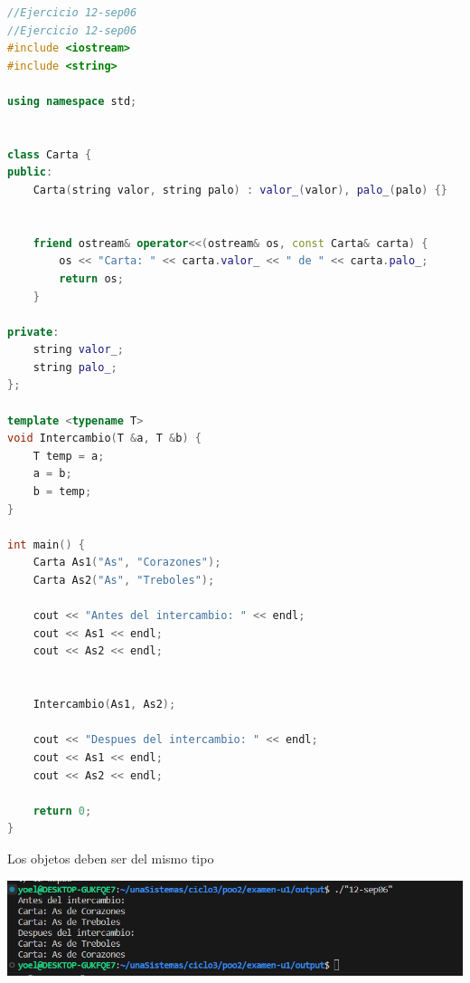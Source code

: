\documentclass[11pt,a4paper]{article}
\begin{document}
\begin{lstlisting}[language=C++, style=mystyle, caption={12 SEPT06}]
//Ejercicio 12-sep06
//Ejercicio 12-sep06
#include <iostream>
#include <string>

using namespace std;


class Carta {
public:
    Carta(string valor, string palo) : valor_(valor), palo_(palo) {}

 
    friend ostream& operator<<(ostream& os, const Carta& carta) {
        os << "Carta: " << carta.valor_ << " de " << carta.palo_;
        return os;
    }

private:
    string valor_;
    string palo_;
};

template <typename T>
void Intercambio(T &a, T &b) {
    T temp = a;
    a = b;
    b = temp;
}

int main() {
    Carta As1("As", "Corazones");
    Carta As2("As", "Treboles");

    cout << "Antes del intercambio: " << endl;
    cout << As1 << endl;
    cout << As2 << endl; 


    Intercambio(As1, As2);

    cout << "Despues del intercambio: " << endl;
    cout << As1 << endl; 
    cout << As2 << endl; 

    return 0;
}


\end{lstlisting}

Los objetos deben ser del mismo tipo


{\includegraphics[width=1\textwidth]{images/4-compilado.png}\par}
\end{document}
